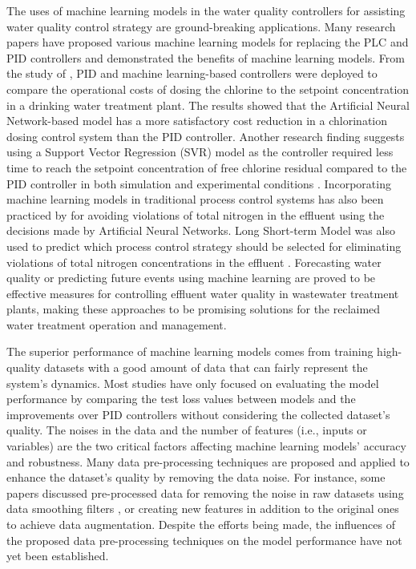 The uses of machine learning models in the water quality controllers for assisting water quality control strategy are ground-breaking applications. Many research papers have proposed various machine learning models for replacing the PLC and PID controllers and demonstrated the benefits of machine learning models. From the study of \citep{librantzArtificialNeuralNetworks2018}, PID and machine learning-based controllers were deployed to compare the operational costs of dosing the chlorine to the setpoint concentration in a drinking water treatment plant. The results showed that the Artificial Neural Network-based model has a more satisfactory cost reduction in a chlorination dosing control system than the PID controller. Another research finding suggests using a Support Vector Regression (SVR) model as the controller required less time to reach the setpoint concentration of free chlorine residual compared to the PID controller in both simulation and experimental conditions \citet{wangModelPredictiveControl2020}. Incorporating machine learning models in traditional process control systems has also been practiced by \citet{santinFuzzyControlModel2015} for avoiding violations of total nitrogen in the effluent using the decisions made by Artificial Neural Networks. Long Short-term Model was also used to predict which process control strategy should be selected for eliminating violations of total nitrogen concentrations in the effluent \cite{pisaLSTMBasedWastewaterTreatment2019}. Forecasting water quality or predicting future events using machine learning are proved to be effective measures for controlling effluent water quality in wastewater treatment plants, making these approaches to be promising solutions for the reclaimed water treatment operation and management.

The superior performance of machine learning models comes from training high-quality datasets with a good amount of data that can fairly represent the system's dynamics. Most studies have only focused on evaluating the model performance by comparing the test loss values between models and the improvements over PID controllers without considering the collected dataset's quality. The noises in the data and the number of features (i.e., inputs or variables) are the two critical factors affecting machine learning models' accuracy and robustness. Many data pre-processing techniques are proposed and applied to enhance the dataset's quality by removing the data noise. For instance, some papers discussed pre-processed data for removing the noise in raw datasets using data smoothing filters \citep{chengForecastingWastewaterTreatment2020}, or creating new features in addition to the original ones \citep{mamandipoorMonitoringDetectingFaults2020} to achieve data augmentation. Despite the efforts being made, the influences of the proposed data pre-processing techniques on the model performance have not yet been established.

